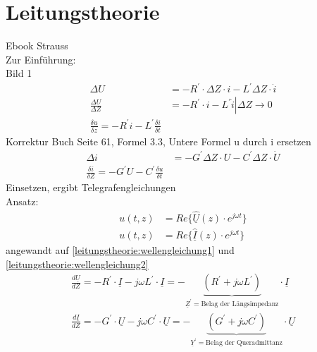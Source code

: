 \section{Leitungstheorie}
Ebook Strauss\\
Zur Einführung:\\
Bild 1\\
\begin{align}
	\Delta U &= -R^\prime\cdot\Delta Z \cdot i - L^\prime\Delta Z \cdot \dot
	i\nonumber\\
	\frac{\Delta U}{\Delta Z} &= \left. -R^\prime\cdot i - L^\prime\dot i \right|
	\Delta Z \rightarrow 0\nonumber\\
	\boxed{\frac{\delta u}{\delta z}=-R^\prime i- L^\prime \frac{\delta i}{\delta
	t}}\label{leitungstheorie:wellengleichung1}
\end{align}
Korrektur Buch Seite 61, Formel 3.3, Untere Formel u durch i ersetzen\\
\begin{align}
	\Delta i &= -G^\prime \Delta Z \cdot U - C^\prime \Delta Z \cdot \dot
	U\nonumber\\
	\boxed{\frac{\delta i}{\delta Z}=-G^\prime U - C^\prime \frac{\delta u}{\delta
	t}}\label{leitungstheorie:wellengleichung2}
\end{align}
Einsetzen, ergibt Telegrafengleichungen\\
Ansatz:
\begin{align}
	u(t,z) &= Re \{ \underline{\hat U}(z)\cdot e^{j\omega t} \} \nonumber\\
	u(t,z) &= Re \{ \underline{\hat I}(z)\cdot e^{j\omega t} \} \nonumber
\end{align}
angewandt auf \ref{leitungstheorie:wellengleichung1} und
\ref{leitungstheorie:wellengleichung2}\\
\begin{align}
	\frac{d\underline{U}}{dZ}=-R^\prime\cdot\underline{I}-j\omega
	L^\prime\cdot\underline{I}=- \underbrace{\left(R^\prime+j\omega
	L^\prime\right)}_{\underline{Z}^\prime=\text{Belag der
	Längsimpedanz}}\cdot\underline{I}\label{leitungstheorie:angewandt1}\\
	\frac{d\underline{I}}{dZ}=-G^\prime\cdot\underline{U}-j\omega
	C^\prime\cdot\underline{U}=- \underbrace{\left(G^\prime+j\omega
	C^\prime\right)}_{\underline{Y}^\prime=\text{Belag der
	Queradmittanz}}\cdot\underline{U}\label{leitungstheorie:angewandt2}
\end{align}
